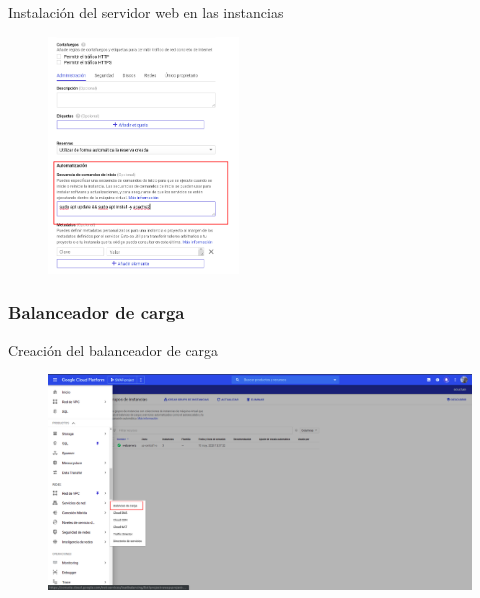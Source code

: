 \documentclass{beamer}
\begin{document}
\begin{frame}[fragile]{Instalación del servidor web en las instancias}
  \begin{figure}[H]
		\centering
		\includegraphics[width=0.45\textwidth]{project/automation.png}
	\end{figure}
\end{frame}

\subsubsection{Balanceador de carga}


\begin{frame}[fragile]{Creación del balanceador de carga}
  \begin{figure}[H]
		\centering
		\includegraphics[width=\textwidth]{project/loadbalancer.png}
	\end{figure}
\end{frame}
\end{document}

